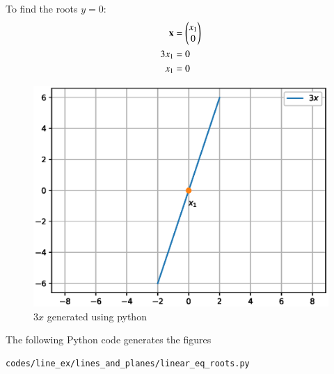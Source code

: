 \begin{enumerate}
To find the roots $y=0$:
\begin{align}
\mathbf{x} &= \begin{pmatrix}x_1\\0\end{pmatrix} \\
3x_1  &= 0 \\
x_1 &= 0
\end{align}
\begin{figure}[!ht] 
\centering
\includegraphics[width=\columnwidth]{./figs/line_ex/lines_and_planes/eq5.eps}
\caption{$3x$ generated using python}
\label{fig:eq5_lines_and_planes}
\end{figure}
 
\newpage
The  following Python code generates the figures
\begin{lstlisting}
codes/line_ex/lines_and_planes/linear_eq_roots.py
\end{lstlisting}

\end{enumerate}

